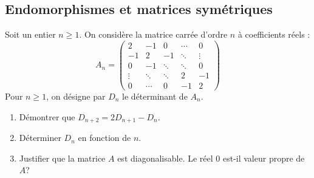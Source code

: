 \documentclass[a4paper,twoside,french,11pt]{VcCours}
\begin{document}
\subsection{Endomorphismes et matrices symétriques}


\begin{Exercice}{} Soit un entier $n\geq 1.$ On considère la matrice carr\'{e}e d'ordre $n$ \`{a} coefficients r\'{e}els :
\begin{equation*}
A_n=\begin{pmatrix}
2 & -1 & 0 & \cdots & 0 \\ 
-1 & 2 & -1 & \ddots & \vdots \\ 
0 & -1 & \ddots & \ddots & 0 \\ 
\vdots & \ddots & \ddots & 2 & -1 \\ 
0 & \cdots & 0 & -1 & 2
\end{pmatrix}
\end{equation*}
Pour $n\geq 1$, on d\'{e}signe par $D_{n}$ le d\'{e}terminant de $A_n$.
\begin{enumerate}
\item Démontrer que $D_{n+2}=2D_{n+1}-D_{n}$.
\item D\'{e}terminer $D_{n}$ en fonction de $n$.
\item Justifier que la matrice $A$ est diagonalisable. Le r\'{e}el $0$ est-il valeur propre de $A$?
\end{enumerate}
\end{Exercice}

\end{document}
